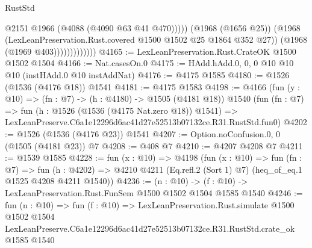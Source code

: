 \begin{lexlean}{RustStd}
\begin{coremodule}
                                @2151
                                @1966
                                (@4088 (@4090 @63 @41 @470)))))
                          (@1968 (@1656 @25))
                          (@1968 (LexLeanPreservation.Rust.covered @1500 @1502 @25 @1864 @352 @27))
                          (@1968 (@1969 @403)))))))))))))
@4165 := LexLeanPreservation.Rust.CrateOK @1500 @1502 @1504
@4166 := Nat.casesOn.{0}
@4175 := HAdd.hAdd.{0, 0, 0} @10 @10 @10 (instHAdd.{0} @10 instAddNat)
@4176 := @4175 @1585
@4180 := @1526 (@1536 (@4176 @18)) @1541
@4181 := @4175 @1583
@4198 := @4166
    (fun (y : @10) => (fn : @7) -> (h : @4180) -> @1505 (@4181 @18))
    @1540
    (fun (fn : @7) =>
    fun (h : @1526 (@1536 (@4175 Nat.zero @18)) @1541) =>
    LexLeanPreserve.C6a1e12296d6ac41d27e52513b07132ce.R31.RustStd.fun0)
@4202 := @1526 (@1536 (@4176 @23)) @1541
@4207 := Option.noConfusion.{0, 0} (@1505 (@4181 @23)) @7
@4208 := @408 @7
@4210 := @4207 @4208 @7
@4211 := @1539 @1585
@4228 := fun (x : @10) =>
  @4198
    (fun (x : @10) =>
    fun (fn : @7) =>
    fun (h : @4202) =>
    @4210 @4211 (Eq.refl.{2} (Sort 1) @7) (heq_of_eq.{1} @1525 @4208 @4211 @1540))
@4236 := (n : @10) -> (f : @10) -> LexLeanPreservation.Rust.FunSem @1500 @1502 @1504 @1585 @1540
@4246 := fun (n : @10) =>
  fun (f : @10) =>
  LexLeanPreservation.Rust.simulate
    @1500
    @1502
    @1504
    LexLeanPreserve.C6a1e12296d6ac41d27e52513b07132ce.R31.RustStd.crate_ok
    @1585
    @1540
\end{coremodule}
\end{lexlean}
